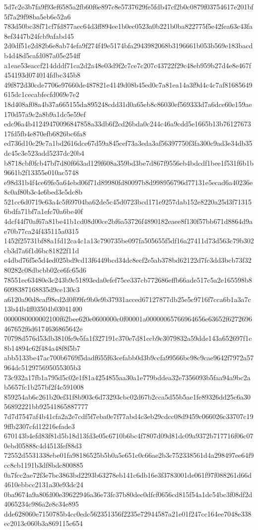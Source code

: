 {5d7c2e3b7fa9f93ef6585a2fb60f6e897c8e5737629fe5fdb47cf2b0c0879f03754617e201bf5f7a29f98ba5eb6e52a6
783d50bc38f71cf7fd877aec64d3ff894ee1b0ec0523a0b221b0ba822775f5e42fea63c43fa8ef3447b24fcb9afabd45
2d0df51e2d82b6e8ab74efa9f274f49e5174bfa2943982068b3196661b053b569e183bacdb4d48d5cafd087a05e254ff
a1eae53eaccf214dddf71ca2d2a48e03d9f2c7ce7c207c43722f29c48eb959b27d4e8e467f454193d074014fdbc345b8
49f872d30cde7706e97660de487821e4149d08b45ed0c7a81ea14a3f9d4c4c7af81685649615dc1cecabfecfd069e7e2
18d408af08a4b37a665155da895248cdd31d0a65eb8c86030ef569333d7a6dce60e159ae170d57a9c2a8b9a1dc5e59ef
edc96a4b41249470096847858a33db6f2cd26bda0c244c46a9cdd5e1665b13b7612767317fd5fb4e870efb6826bc6fa8
ed736d10c29c7a1bd2616dce67d59a845cef73a3eda3af56397750f3fa300c9ad3e34db35dc45c3e523add5237dc20b4
b8718cbf0fcb47bf7d80f663ad129f608a359bd3be7d867f9556eb4bdcdf1bee1f531f6b1b9661b2f13355e010ac5748
e98d31b4f4ce69fe5a64ebd06f71d89980fd80097b8d998956796d77131e5ecad6a40236e8c0af80b3c4e6bed3e5dc8b
521cc6d0719e63a4c5f69704ba62de5c45d0723bcd171e9257dab152e8220a25d3f713156bdfa71bf7a1efc70a6be40f
4dcf44f70af67a81be41b1cd08d00ce2bf6a53726f4890182eaee8f130f57bb671d8864d9ae70b77ca24f435115a0315
1452f25731bf88a1fd12ca4c1a13c790735be097fa505655f5df16a27411d73d563c79b302cb3d7a6f1d6bc81822f11d
e4dbd76f5e5d4ed025bd9cd13f6449bcd34dc8ecf2e5ab378bd62122d7fc3dd3bcb73f3280282c08dbcbb02ce6fc65d6
78551ec63480e3c243b9c51893eda0efef75ce337cb772686effb66ade517c5a2e165598b86098387168835d9ce130c3
a6120a90d8caf98cd2d0f09fc9b0e9b37931acced67127877db25e5c9716f7cca6b1a3a7c13b44b4ff03504b03041400
0000080000002100f62bee620e0600000c0f00001a00000065766964656e63652f6272696467652f6d6174636865642e
70798d576d53db3810fe9e5fa1f327191c370e7d81ccb9c3079832a59dde143a652697f1c8b14894c62f484a48f8f5b7
abb5133be47ac700b6769f5dadf655f63cefabb0d3b9ccfa99566bc98c9cae9642f7972a57964dc512975695055305b3
73c932a17fb1a795d5c02e1f81a4254855aa30a1e779bddea32e7356093b5faa94a9bc2ab5657fc1b257bf2f4c591008
859254ab6c261b20ef31f8b903c6d73293cbc02d67b2cca5d55b5ae1fe89326dd25c6a3056892221bb92541865887777
7d7d7547af4b41cfa2a2e7cdf5f7eba0e7f77abd4c3eb29cdcc08d9459c066026c33707c199ffb2307cfd12216efade3
670143b4efd83f81d5b18d13fd3e05c6710b6bc4f7807d09d81dc09a9372b717716f06c070ebd05888c4d4513fef88d3
72552d5531338ebe01fa98186525b5b0a5e651c0c66ae2b3c752338561d4a298497ee64f9cc8cb1191b3df8bdc800885
0a7fcc2ae72f3e7bc3863bd2293b63278eb141c6db16e3f3783001de061f97f088261d66d4610ebbcc2131a30e93dc24
0ba9674a9a80fd00e39622946a36e73fc37b80dec0dfcf0656cd815f54a1dc54bc3f08df2d4065234c986a2e8c34e895
dde628060e7150785b4cc0edc562351356f2235e72944587a21e01f247cc164ee7048e338ec2013c060b3a869115c654
}

